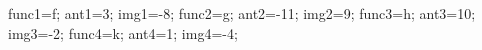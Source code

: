 \documentclass[exercice]{thedocument}%
\begin{document}
%
    \>func1=f;%
    \>ant1=3;%
    \>img1=-8;%
    \>func2=g;%
    \>ant2=-11;%
    \>img2=9;%
    \>func3=h;%
    \>ant3=10;%
    \>img3=-2;%
    \>func4=k;%
    \>ant4=1;%
    \>img4=-4;%
\end{document}

